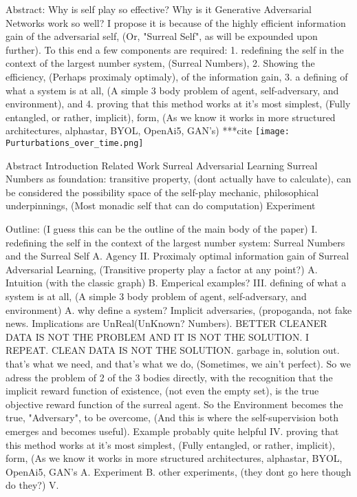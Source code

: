 \documentclass{article}
\begin{document}
\usepackage{graphicx}
Abstract: 
Why is self play so effective? Why is it Generative Adversarial Networks work so well? I propose it is because of the highly efficient information gain of the adversarial self, (Or, "Surreal Self", as will be expounded upon further). To this end a few components are required: 1. redefining the self in the context of the largest number system, (Surreal Numbers), 2. Showing the efficiency, (Perhaps proximaly optimaly), of the information gain, 3. a defining of what a system is at all, (A simple 3 body problem of agent, self-adversary, and environment), and 4. proving that this method works at it's most simplest, (Fully entangled, or rather, implicit), form, (As we know it works in more structured architectures, alphastar, BYOL, OpenAi5, GAN's) ***cite 
\texttt{[image: Purturbations\_over\_time.png]}

Abstract
Introduction
Related Work
Surreal Adversarial Learning
	Surreal Numbers as foundation: transitive property, (dont actually have to calculate), can be considered the possibility space of the self-play mechanic, philosophical underpinnings, (Most monadic self that can do computation)
Experiment

Outline: (I guess this can be the outline of the main body of the paper)
I. redefining the self in the context of the largest number system: Surreal Numbers and the Surreal Self
	A. Agency
II. Proximaly optimal information gain of Surreal Adversarial Learning, (Transitive property play a factor at any point?)
	A. Intuition (with the classic graph)
	B. Emperical examples?
III. defining of what a system is at all, (A simple 3 body problem of agent, self-adversary, and environment)
	A. why define a system? Implicit adversaries, (propoganda, not fake news.
 	Implications are UnReal(UnKnown? Numbers). BETTER CLEANER DATA IS
	NOT THE PROBLEM AND IT IS NOT THE SOLUTION. I REPEAT. CLEAN
	DATA IS NOT THE SOLUTION. garbage in, solution out. that's what we
	need, and that's what we do, (Sometimes, we ain't perfect). So we adress
	the problem of 2 of the 3 bodies directly, with the recognition that the
	implicit reward function of existence, (not even the empty set), is the true 
	objective reward function of the surreal agent. So the Environment becomes the true, "Adversary", to be overcome, (And this is where the self-supervision both emerges and becomes useful). Example probably quite helpful
IV. proving that this method works at it's most simplest, (Fully entangled, or
	rather, implicit), form, (As we know it works in more structured
	architectures, alphastar, BYOL, OpenAi5, GAN's
	A. Experiment
	B. other experiments, (they dont go here though do they?)
V. 
\end{document}
